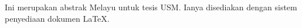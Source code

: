 \begin{MsAbstract}

Ini merupakan abstrak Melayu untuk tesis USM.  Ianya disediakan dengan sistem penyediaan dokumen \LaTeX.
\end{MsAbstract}
